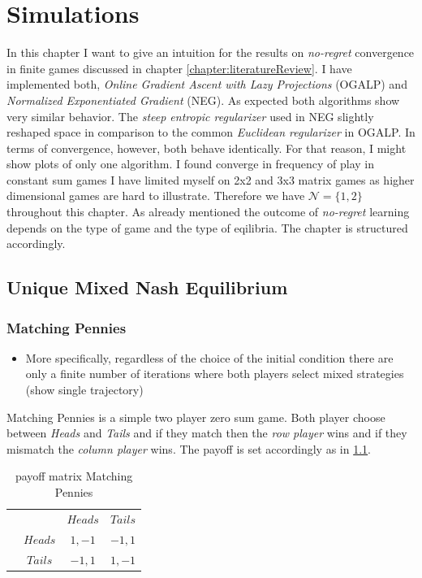 
\chapter{Simulations}\label{chapter:simulations}

In this chapter I want to give an intuition for the results on \textit{no-regret} convergence in finite games discussed in chapter \ref{chapter:literatureReview}. I have implemented both, \textit{Online Gradient Ascent with Lazy Projections} (OGALP) and \textit{Normalized Exponentiated Gradient} (NEG). As expected both algorithms show very similar behavior. The \textit{steep entropic regularizer} used in NEG slightly reshaped space in comparison to the common \textit{Euclidean regularizer} in OGALP. In terms of convergence, however, both behave identically. For that reason, I might show plots of only one algorithm.  I found converge in frequency of play in constant sum games I have limited myself on 2x2 and 3x3 matrix games as higher dimensional games are hard to illustrate. Therefore we have $\mathcal{N} = \{1,2\}$ throughout this chapter. As already mentioned the outcome of \textit{no-regret} learning depends on the type of game and the type of eqilibria. The chapter is structured accordingly. 

\section{Unique Mixed Nash Equilibrium}\label{section:uniqueMixedNashEquilibrium}

\subsection{Matching Pennies}\label{subsection:machtingPennies}

\begin{itemize}
    \item More specifically, regardless of the choice of the initial
condition there are only a finite number of iterations where both players select mixed strategies (show single trajectory)
\end{itemize}

Matching Pennies is a simple two player zero sum game. Both player choose between \textit{Heads} and \textit{Tails} and if they match then the \textit{row player} wins and if they mismatch the \textit{column player} wins. The payoff is set accordingly as in \ref{tab:payoffMachtingPennies}. 

\begin{table}[H]\centering
\setlength{\extrarowheight}{2pt}
\begin{tabular}{cc|c|c|}
  & \multicolumn{1}{c}{} & \multicolumn{1}{c}{$Heads$}  & \multicolumn{1}{c}{$Tails$} \\\cline{3-4}
  & $Heads$ & $1,-1$ & $-1,1$ \\\cline{3-4}
  & $Tails$ & $-1,1$ & $1,-1$ \\\cline{3-4}
\end{tabular}\caption{\label{tab:payoffMachtingPennies}payoff matrix Matching Pennies}
\end{table}

